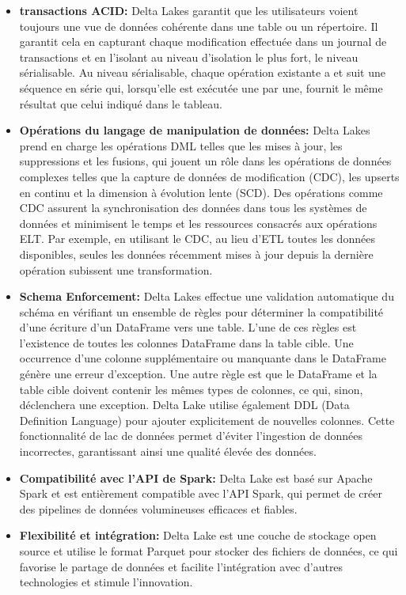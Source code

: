 \begin{itemize}
	\item[\textbullet] \textbf{transactions ACID:} Delta Lakes garantit que les utilisateurs voient toujours une vue de données cohérente dans une table ou un répertoire. Il garantit cela en capturant chaque modification effectuée dans un journal de transactions et en l'isolant au niveau d'isolation le plus fort, le niveau sérialisable. Au niveau sérialisable, chaque opération existante a et suit une séquence en série qui, lorsqu'elle est exécutée une par une, fournit le même résultat que celui indiqué dans le tableau.
	\item[\textbullet] \textbf{Opérations du langage de manipulation de données:} Delta Lakes prend en charge les opérations DML telles que les mises à jour, les suppressions et les fusions, qui jouent un rôle dans les opérations de données complexes telles que la capture de données de modification (CDC), les upserts en continu et la dimension à évolution lente (SCD). Des opérations comme CDC assurent la synchronisation des données dans tous les systèmes de données et minimisent le temps et les ressources consacrés aux opérations ELT. Par exemple, en utilisant le CDC, au lieu d'ETL toutes les données disponibles, seules les données récemment mises à jour depuis la dernière opération subissent une transformation.
	\item[\textbullet] \textbf{Schema Enforcement:} Delta Lakes effectue une validation automatique du schéma en vérifiant un ensemble de règles pour déterminer la compatibilité d'une écriture d'un DataFrame vers une table. L'une de ces règles est l'existence de toutes les colonnes DataFrame dans la table cible. Une occurrence d'une colonne supplémentaire ou manquante dans le DataFrame génère une erreur d'exception. Une autre règle est que le DataFrame et la table cible doivent contenir les mêmes types de colonnes, ce qui, sinon, déclenchera une exception. Delta Lake utilise également DDL (Data Definition Language) pour ajouter explicitement de nouvelles colonnes. Cette fonctionnalité de lac de données permet d'éviter l'ingestion de données incorrectes, garantissant ainsi une qualité élevée des données.
	\item[\textbullet] \textbf{Compatibilité avec l'API de Spark:} Delta Lake est basé sur Apache Spark et est entièrement compatible avec l'API Spark, qui permet de créer des pipelines de données volumineuses efficaces et fiables.
	\item[\textbullet] \textbf{Flexibilité et intégration:} Delta Lake est une couche de stockage open source et utilise le format Parquet pour stocker des fichiers de données, ce qui favorise le partage de données et facilite l'intégration avec d'autres technologies et stimule l'innovation.
\end{itemize}

